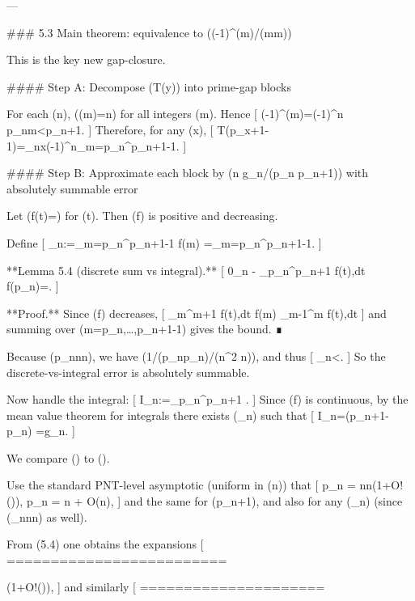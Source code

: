 ---

### 5.3 Main theorem: equivalence to (\sum (-1)^{\pi(m)}/(m\log m))

This is the key new gap-closure.

#### Step A: Decompose (T(y)) into prime-gap blocks

For each (n), (\pi(m)=n) for all integers (m\in[p_n,;p_{n+1}-1]). Hence
[
(-1)^{\pi(m)}=(-1)^n \quad {} p_n\le m<p_{n+1}.
]
Therefore, for any (x),
[
T(p_{x+1}-1)=\sum_{n\le x}(-1)^n\sum_{m=p_n}^{p_{n+1}-1}.
]

#### Step B: Approximate each block by (n g_n/(p_n p_{n+1})) with absolutely summable error

Let (f(t)=) for (t). Then (f) is positive and decreasing.

Define
[
\Sigma_n:=\sum_{m=p_n}^{p_{n+1}-1} f(m)
=\sum_{m=p_n}^{p_{n+1}-1}.
]

**Lemma 5.4 (discrete sum vs integral).**
[
0\le \Sigma_n - \int_{p_n}^{p_{n+1}} f(t),dt \le f(p_n)=.
]

**Proof.** Since (f) decreases,
[
\int_{m}^{m+1} f(t),dt \le f(m) \le \int_{m-1}^{m} f(t),dt
]
and summing over (m=p_n,\dots,p_{n+1}-1) gives the bound. ∎

Because (p_n\asymp n\log n), we have (1/(p_n\log p_n)/(n\log^2 n)), and thus
[
\sum_{n}<\infty.
]
So the discrete-vs-integral error is absolutely summable.

Now handle the integral:
[
I_n:=\int_{p_n}^{p_{n+1}} .
]
Since (f) is continuous, by the mean value theorem for integrals there exists (\xi_n\in[p_n,p_{n+1}]) such that
[
I_n=(p_{n+1}-p_n)
=g_n.
]

We compare () to ().

Use the standard PNT-level asymptotic (uniform in (n)) that
[
p_n = n\log n\left(1+O!\left(\right)\right),
\quad
\log p_n = \log n + O(\log\log n),
]
and the same for (p_{n+1}), and also for any (\xi_n\in[p_n,p_{n+1}]) (since (\xi_n\asymp n\log n) as well).

From (5.4) one obtains the expansions
[
=========================

\left(1+O!\left(\right)\right),
]
and similarly
[
=====================

